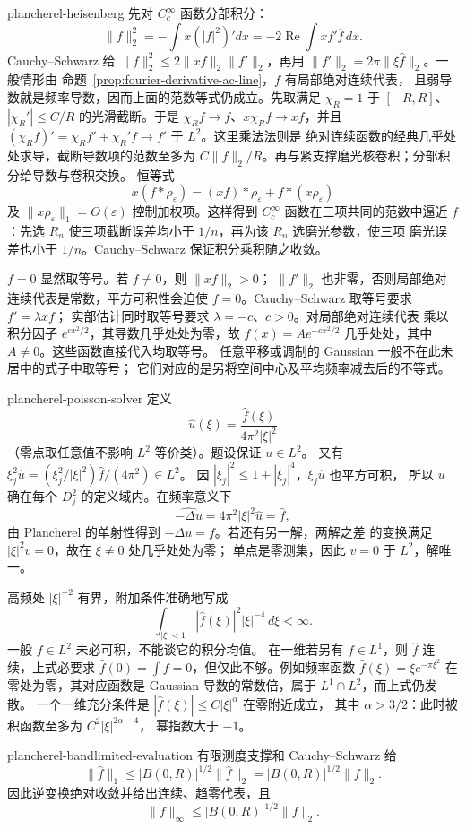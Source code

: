 \begin{solution}{plancherel-heisenberg}
先对 \(C_c^\infty\) 函数分部积分：
\[
 \|f\|_2^2=-\int x(|f|^2)'dx
 =-2\operatorname{Re}\int xf'\overline f\,dx.
\]
Cauchy--Schwarz 给
\(\|f\|_2^2\le2\|xf\|_2\|f'\|_2\)，再用
\(\|f'\|_2=2\pi\|\xi\widehat f\|_2\)。一般情形由
命题~\ref{prop:fourier-derivative-ac-line}，\(f\) 有局部绝对连续代表，
且弱导数就是频率导数，因而上面的范数等式仍成立。先取满足
\(\chi_R=1\) 于 \([-R,R]\)、\(|\chi_R'|\le C/R\) 的光滑截断。于是
\(\chi_Rf\to f\)、\(x\chi_Rf\to xf\)，并且
\((\chi_Rf)'=\chi_Rf'+\chi_R'f\to f'\) 于 \(L^2\)。这里乘法法则是
绝对连续函数的经典几乎处处求导，截断导数项的范数至多为
\(C\|f\|_2/R\)。再与紧支撑磨光核卷积；分部积分给导数与卷积交换。
恒等式
\[
 x(f*\rho_\varepsilon)
 =(xf)*\rho_\varepsilon+f*(x\rho_\varepsilon)
\]
及 \(\|x\rho_\varepsilon\|_1=O(\varepsilon)\) 控制加权项。这样得到
\(C_c^\infty\) 函数在三项共同的范数中逼近 \(f\)：先选 \(R_n\)
使三项截断误差均小于 \(1/n\)，再为该 \(R_n\) 选磨光参数，使三项
磨光误差也小于 \(1/n\)。Cauchy--Schwarz 保证积分乘积随之收敛。

\(f=0\) 显然取等号。若 \(f\ne0\)，则 \(\|xf\|_2>0\)；
\(\|f'\|_2\) 也非零，否则局部绝对连续代表是常数，平方可积性会迫使
\(f=0\)。Cauchy--Schwarz 取等号要求 \(f'=\lambda xf\)；
实部估计同时取等号要求 \(\lambda=-c\)、\(c>0\)。对局部绝对连续代表
乘以积分因子 \(e^{cx^2/2}\)，其导数几乎处处为零，故
\(f(x)=Ae^{-cx^2/2}\) 几乎处处，其中 \(A\ne0\)。这些函数直接代入均取等号。
任意平移或调制的 Gaussian 一般不在此未居中的式子中取等号；
它们对应的是另将空间中心及平均频率减去后的不等式。
\end{solution}

\begin{solution}{plancherel-poisson-solver}
定义
\[
 \widehat u(\xi)=\frac{\widehat f(\xi)}{4\pi^2|\xi|^2}
\]
（零点取任意值不影响 \(L^2\) 等价类）。题设保证 \(u\in L^2\)。
又有 \(\xi_j^2\widehat u=(\xi_j^2/|\xi|^2)\widehat f/(4\pi^2)\in L^2\)。
因 \(|\xi_j|^2\le1+|\xi_j|^4\)，\(\xi_j\widehat u\) 也平方可积，
所以 \(u\) 确在每个 \(D_j^2\) 的定义域内。在频率意义下
\[
 \widehat{-\Delta u}=4\pi^2|\xi|^2\widehat u=\widehat f,
\]
由 Plancherel 的单射性得到 \(-\Delta u=f\)。若还有另一解，两解之差
的变换满足 \(|\xi|^2\widehat v=0\)，故在 \(\xi\ne0\) 处几乎处处为零；
单点是零测集，因此 \(v=0\) 于 \(L^2\)，解唯一。

高频处 \(|\xi|^{-2}\) 有界，附加条件准确地写成
\[
 \int_{|\xi|<1}|\widehat f(\xi)|^2|\xi|^{-4}\,d\xi<\infty.
\]
一般 \(f\in L^2\) 未必可积，不能谈它的积分均值。
在一维若另有 \(f\in L^1\)，则 \(\widehat f\) 连续，上式必要求
\(\widehat f(0)=\int f=0\)，但仅此不够。例如频率函数
\(\widehat f(\xi)=\xi e^{-\pi\xi^2}\) 在零处为零，其对应函数是
Gaussian 导数的常数倍，属于 \(L^1\cap L^2\)，而上式仍发散。
一个一维充分条件是 \(|\widehat f(\xi)|\le C|\xi|^\alpha\) 在零附近成立，
其中 \(\alpha>3/2\)：此时被积函数至多为 \(C^2|\xi|^{2\alpha-4}\)，
幂指数大于 \(-1\)。
\end{solution}

\begin{solution}{plancherel-bandlimited-evaluation}
有限测度支撑和 Cauchy--Schwarz 给
\[
 \|\widehat f\|_1
 \le |B(0,R)|^{1/2}\|\widehat f\|_2
 =|B(0,R)|^{1/2}\|f\|_2.
\]
因此逆变换绝对收敛并给出连续、趋零代表，且
\[
 \|f\|_\infty\le |B(0,R)|^{1/2}\|f\|_2.
\]
\end{solution}
